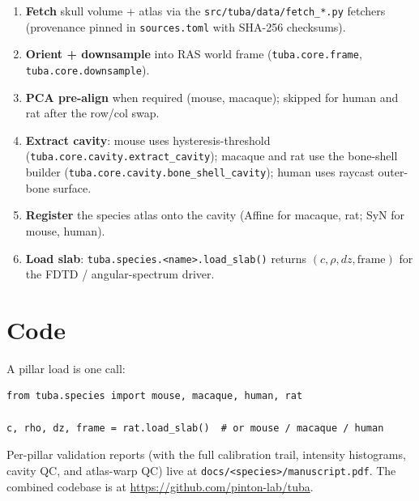 \documentclass{compactarticle}
\begin{document}
\begin{enumerate}[leftmargin=*,itemsep=0pt]
\item \textbf{Fetch} skull volume + atlas via the
      \texttt{src/tuba/data/fetch\_*.py} fetchers (provenance pinned
      in \texttt{sources.toml} with SHA-256 checksums).
\item \textbf{Orient + downsample} into RAS world frame
      (\texttt{tuba.core.frame}, \texttt{tuba.core.downsample}).
\item \textbf{PCA pre-align} when required (mouse, macaque); skipped
      for human and rat after the row/col swap.
\item \textbf{Extract cavity}: mouse uses hysteresis-threshold
      (\texttt{tuba.core.cavity.extract\_cavity}); macaque and rat use
      the bone-shell builder (\texttt{tuba.core.cavity.bone\_shell\_cavity});
      human uses raycast outer-bone surface.
\item \textbf{Register} the species atlas onto the cavity (Affine
      for macaque, rat; SyN for mouse, human).
\item \textbf{Load slab}: \texttt{tuba.species.<name>.load\_slab()}
      returns $(c, \rho, dz, \mathrm{frame})$ for the FDTD /
      angular-spectrum driver.
\end{enumerate}

\section{Code}

A pillar load is one call:

\begin{lstlisting}[basicstyle=\small\ttfamily,
                   backgroundcolor=\color{black!5},
                   frame=single,framerule=0pt]
from tuba.species import mouse, macaque, human, rat

c, rho, dz, frame = rat.load_slab()  # or mouse / macaque / human
\end{lstlisting}

Per-pillar validation reports (with the full calibration trail,
intensity histograms, cavity QC, and atlas-warp QC) live at
\texttt{docs/<species>/manuscript.pdf}. The combined codebase is at
\url{https://github.com/pinton-lab/tuba}.

\providecommand{\gs}[2]{\href{https://scholar.google.com/scholar?q=#1}{#2}}
\end{document}
